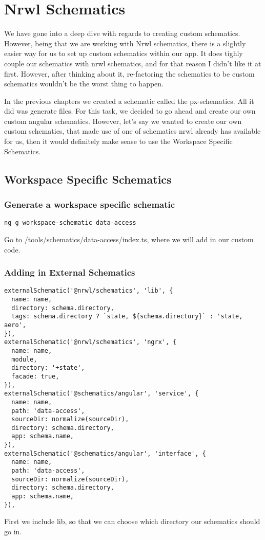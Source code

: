 \maketitle{}
\section{ Nrwl Schematics }

We have gone into a deep dive with regards to creating custom schematics.
However, being that we are working with Nrwl schematics, there is a slightly
easier way for us to set up custom schematics within our app. It does tighly
couple our schematics with nrwl schematics, and for that reason I didn't like
it at first. However, after thinking about it, re-factoring the schematics to
be custom schematics wouldn't be the worst thing to happen.

In the previous chapters we created a schematic called the px-schematics. All it
did was generate files. For this task, we decided to go ahead and create our own
custom angular schematics. However, let's say we wanted to create our own
custom schematics, that made use of one of schematics nrwl already has available
for us, then it would definitely make sense to use the Workspace Specific
Schematics.

\subsection{ Workspace Specific Schematics }
\subsubsection{Generate a workspace specific schematic}
\begin{verbatim}
ng g workspace-schematic data-access
\end{verbatim}

Go to /tools/schematics/data-access/index.ts, where we will add in our custom
code.

\subsubsection{ Adding in External Schematics}
\begin{lstlisting}
externalSchematic('@nrwl/schematics', 'lib', {
  name: name,
  directory: schema.directory,
  tags: schema.directory ? `state, ${schema.directory}` : 'state, aero',
}),
externalSchematic('@nrwl/schematics', 'ngrx', {
  name: name,
  module,
  directory: '+state',
  facade: true,
}),
externalSchematic('@schematics/angular', 'service', {
  name: name,
  path: 'data-access',
  sourceDir: normalize(sourceDir),
  directory: schema.directory,
  app: schema.name,
}),
externalSchematic('@schematics/angular', 'interface', {
  name: name,
  path: 'data-access',
  sourceDir: normalize(sourceDir),
  directory: schema.directory,
  app: schema.name,
}),
\end{lstlisting}

First we include lib, so that we can choose which directory our schematics
should go in.
